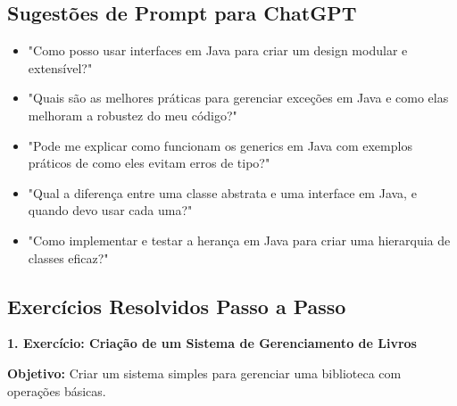 \documentclass[a4paper,12pt]{book}
\begin{document}
\subsection{Sugestões de Prompt para ChatGPT}
\begin{itemize}
    \item "Como posso usar interfaces em Java para criar um design modular e extensível?"
    \item "Quais são as melhores práticas para gerenciar exceções em Java e como elas melhoram a robustez do meu código?"
    \item "Pode me explicar como funcionam os generics em Java com exemplos práticos de como eles evitam erros de tipo?"
    \item "Qual a diferença entre uma classe abstrata e uma interface em Java, e quando devo usar cada uma?"
    \item "Como implementar e testar a herança em Java para criar uma hierarquia de classes eficaz?"
\end{itemize}

\subsection{Exercícios Resolvidos Passo a Passo}

\textbf{1. Exercício: Criação de um Sistema de Gerenciamento de Livros}

\textbf{Objetivo:} Criar um sistema simples para gerenciar uma biblioteca com operações básicas.
\end{document}
